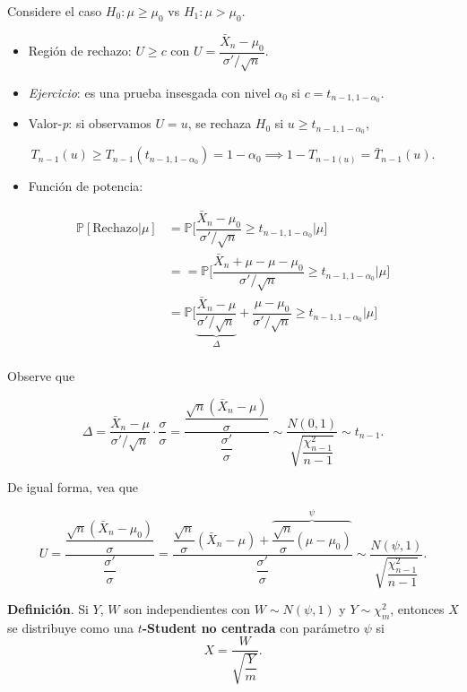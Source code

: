 \documentclass[
  12pt,
]{book}
\providecommand{\tightlist}{%
  \setlength{\itemsep}{0pt}\setlength{\parskip}{0pt}}
\begin{document}
Considere el caso \(H_0: \mu\geq \mu_0\) vs \(H_1: \mu>\mu_0\).

\begin{itemize}
\item
  Región de rechazo: \(U\geq c\) con \(U= \dfrac{\bar X_n -\mu_0}{\sigma' /\sqrt n}\).
\item
  \emph{Ejercicio}: es una prueba insesgada con nivel \(\alpha_0\) si \(c = t_{n-1,1-\alpha_0}\).
\item
  Valor-\emph{p}: si observamos \(U=u\), se rechaza \(H_0\) si \(u\geq t_{n-1,1-\alpha_0}\),
\end{itemize}

\[T_{n-1}(u) \geq T_{n-1}(t_{n-1,1-\alpha_0}) = 1-\alpha_0 \implies 1-T_{n-1(u)} = \bar T_{n-1}(u).\]

\begin{itemize}
\tightlist
\item
  Función de potencia:
\end{itemize}

\begin{align*}
\mathbb P[\text{Rechazo}|\mu] & = \mathbb P\bigg[ \dfrac{\bar X_n -\mu_0}{\sigma' /\sqrt n}\geq t_{n-1,1-\alpha_0}\bigg| \mu \bigg]\\
&= = \mathbb P\bigg[ \dfrac{\bar X_n +\mu-\mu-\mu_0}{\sigma' /\sqrt n}\geq t_{n-1,1-\alpha_0}\bigg| \mu \bigg]\\
& = \mathbb P\bigg[ \underbrace{\dfrac{\bar X_n -\mu}{\sigma' /\sqrt n}}_{\Delta}+ \dfrac{\mu-\mu_0}{\sigma' /\sqrt n}\geq t_{n-1,1-\alpha_0}\bigg| \mu \bigg]\\
\end{align*}

Observe que

\[\Delta = \dfrac{\bar X_n -\mu}{\sigma' /\sqrt n}\cdot\dfrac\sigma\sigma = \dfrac{\dfrac{\sqrt n(\bar X_n-\mu)}{\sigma} }{\dfrac{\sigma'}\sigma } \sim \dfrac{N(0,1)}{\sqrt{\dfrac{\chi^2_{n-1}}{n-1}}} \sim t_{n-1}.\]

De igual forma, vea que

\[
U = \dfrac{\dfrac{\sqrt n(\bar X_n-\mu_0)}{\sigma}}{\dfrac{\sigma'}{\sigma}} = \dfrac{\dfrac{\sqrt n}{\sigma}(\bar X_n-\mu) +\overbrace{\dfrac{\sqrt n}{\sigma}(\mu-\mu_0)}^{\psi}}{\dfrac{\sigma'}{\sigma}} \sim \dfrac{N(\psi,1)}{\sqrt{\dfrac{\chi^2_{n-1}}{n-1}}}.
\]

\textbf{Definición}. Si \(Y\), \(W\) son independientes con \(W\sim N(\psi,1)\) y \(Y\sim \chi^2_m\), entonces \(X\) se distribuye como una \textbf{\(t\)-Student no centrada} con
parámetro \(\psi\) si \[X = \dfrac W{\sqrt{\dfrac{Y}{m}}}.\]
\end{document}
